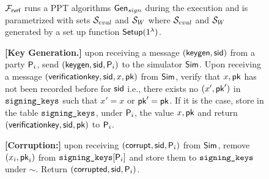 

\begin{figure}
\footnotesize
	\begin{tcolorbox}[left=2pt,right=2pt]
		{  $ \mathcal{F}_{\textsf{rvrf}} $ runs a PPT algorithms  $\mathsf{Gen}_{sign} $ during the execution and is parametrized with  sets $ {\mathcal{S}}_{eval} $ and $ {\mathcal{S}}_W $ where $ {\mathcal{S}}_{eval} $ and $ {\mathcal{S}}_W $ generated by a set up function $ \mathsf{Setup}(1^\lambda) $.
			
			

			\textbf{[Key Generation.]} upon receiving a message $(\mathsf{keygen}, \textsf{sid})$ from a party $\mathsf{P}_i$, send $(\mathsf{keygen}, \textsf{sid}, \mathsf{P}_i)$ to the simulator $\mathsf{Sim}$.
			Upon receiving a message $(\mathsf{verificationkey}, \textsf{sid}, x,\mathsf{pk})$ from $\mathsf{Sim}$, verify that $x,\mathsf{pk}$ has not been recorded before for $ \textsf{sid} $ i.e., there exists no $ (x', \mathsf{pk}') $ in $ \texttt{signing\_keys} $ such that $ x' = x $ or $ \mathsf{pk}' = \mathsf{pk} $. If it is the case, store in the table $\texttt{signing\_keys}$, under $\mathsf{P}_i$, the value $x,\mathsf{pk}$ and return $(\mathsf{verificationkey}, \textsf{sid}, \mathsf{pk})$ to $ \mathsf{P}_i$.
			
			
			\textbf{[Corruption:] } 
			upon receiving $ (\mathsf{corrupt}, \textsf{sid}, \mathsf{P}_i) $ from $ \mathsf{Sim} $, remove $ (x_i,\mathsf{pk}_i) $ from $ \texttt{signing\_keys}[\mathsf{P}_i] $ and store them to $ \texttt{signing\_keys} $ under $ \sim $. Return $ (\mathsf{corrupted}, \textsf{sid},\mathsf{P}_i) $.
			
}
\end{tcolorbox}
\end{figure}
